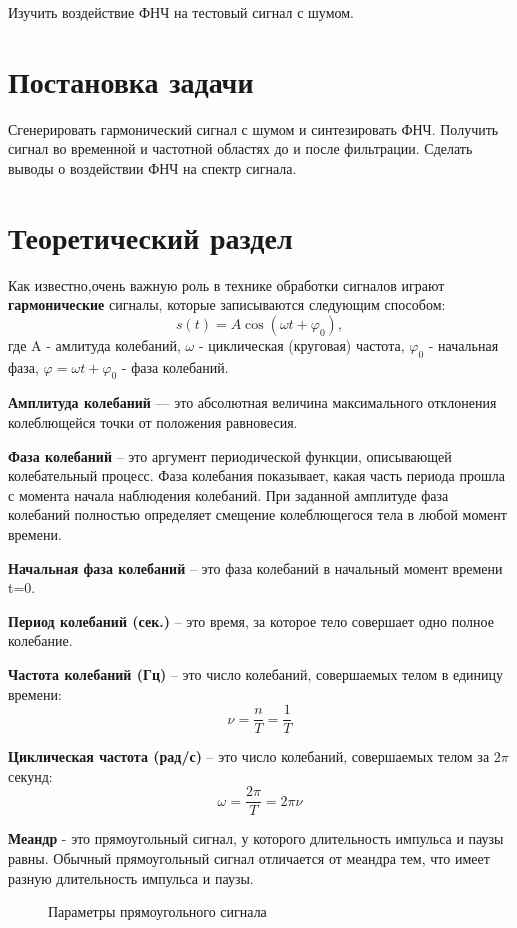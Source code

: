 \documentclass[12pt,a4paper]{scrartcl}
\begin{document}
Изучить воздействие ФНЧ на тестовый сигнал с шумом.\\

\section{Постановка задачи}
\label{sec:task}

Сгенерировать гармонический сигнал с шумом и синтезировать ФНЧ. Получить сигнал во временной и частотной областях до и после фильтрации. Сделать выводы о воздействии ФНЧ на спектр сигнала.\\

\section{Теоретический раздел}
\label{sec:teoriya}
Как известно,очень важную роль в технике обработки сигналов играют \textbf{гармонические} сигналы, которые записываются следующим способом:
$$s(t)=A\cos (\omega t+\varphi _0),$$ где  A - амлитуда колебаний, $\omega$ - циклическая (круговая) частота, $\varphi _0$ - начальная фаза, $\varphi = \omega t+\varphi _0$ - фаза колебаний.

\textbf{Амплитуда колебаний} — это абсолютная величина максимального отклонения колеблющейся точки от положения равновесия.

\textbf{Фаза колебаний} – это аргумент периодической функции, описывающей колебательный процесс. Фаза колебания показывает, какая часть периода прошла с момента начала наблюдения колебаний. При заданной амплитуде фаза колебаний полностью определяет смещение колеблющегося тела в любой момент времени.

\textbf{Начальная фаза колебаний} – это фаза колебаний в начальный момент времени t=0. 

\textbf{Период колебаний (сек.)} – это время, за которое тело совершает одно полное колебание. 

\textbf{Частота колебаний (Гц)} – это число колебаний, совершаемых телом в единицу времени:
$$ \nu = \frac{n}{T} = \frac{1}{T}$$

\textbf{Циклическая частота (рад/с)} – это число колебаний, совершаемых телом за $2\pi$ секунд: 
$$\omega = \frac{2\pi}{T} = 2\pi \nu$$

\textbf{Меандр} - это прямоугольный сигнал, у которого длительность импульса и паузы равны. Обычный прямоугольный сигнал отличается от меандра тем, что имеет разную длительность импульса и паузы. 

\begin{figure}[h!]
\caption{Параметры прямоугольного сигнала}
\end{figure}
\end{document}
